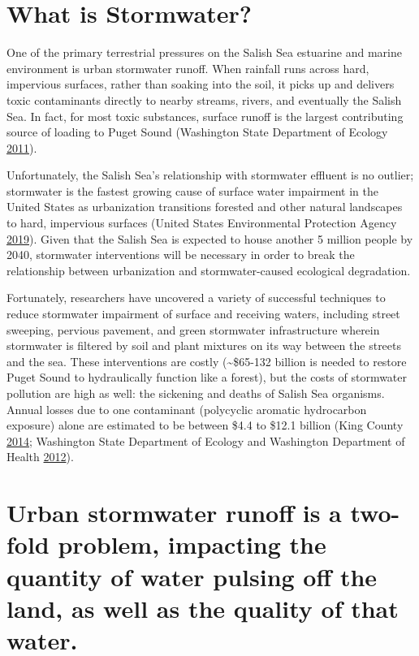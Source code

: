 \documentclass[
]{report}
\begin{document}
\hypertarget{what-is-stormwater}{%
\section{What is Stormwater?}\label{what-is-stormwater}}

One of the primary terrestrial pressures on the Salish Sea estuarine and marine environment is urban stormwater runoff. When rainfall runs across hard, impervious surfaces, rather than soaking into the soil, it picks up and delivers toxic contaminants directly to nearby streams, rivers, and eventually the Salish Sea. In fact, for most toxic substances, surface runoff is the largest contributing source of loading to Puget Sound (Washington State Department of Ecology \protect\hyperlink{ref-WashingtonStateDepartmentofEcology2011}{2011}).

Unfortunately, the Salish Sea's relationship with stormwater effluent is no outlier; stormwater is the fastest growing cause of surface water impairment in the United States as urbanization transitions forested and other natural landscapes to hard, impervious surfaces (United States Environmental Protection Agency \protect\hyperlink{ref-USEPA2019}{2019}). Given that the Salish Sea is expected to house another 5 million people by 2040, stormwater interventions will be necessary in order to break the relationship between urbanization and stormwater-caused ecological degradation.

Fortunately, researchers have uncovered a variety of successful techniques to reduce stormwater impairment of surface and receiving waters, including street sweeping, pervious pavement, and green stormwater infrastructure wherein stormwater is filtered by soil and plant mixtures on its way between the streets and the sea. These interventions are costly (\textasciitilde\$65-132 billion is needed to restore Puget Sound to hydraulically function like a forest), but the costs of stormwater pollution are high as well: the sickening and deaths of Salish Sea organisms. Annual losses due to one contaminant (polycyclic aromatic hydrocarbon exposure) alone are estimated to be between \$4.4 to \$12.1 billion (King County \protect\hyperlink{ref-County2014}{2014}; Washington State Department of Ecology and Washington Department of Health \protect\hyperlink{ref-WashingtonStateDepartmentofEcologyandWashingtonDepartmentofHealth2012}{2012}).

\hypertarget{urban-stormwater-runoff-is-a-two-fold-problem-impacting-the-quantity-of-water-pulsing-off-the-land-as-well-as-the-quality-of-that-water.}{%
\section{Urban stormwater runoff is a two-fold problem, impacting the quantity of water pulsing off the land, as well as the quality of that water.}\label{urban-stormwater-runoff-is-a-two-fold-problem-impacting-the-quantity-of-water-pulsing-off-the-land-as-well-as-the-quality-of-that-water.}}
\end{document}
